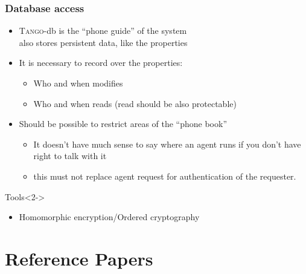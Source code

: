 \documentclass{beamer}
\newcommand{\tango}{\textsc{Tango}}
\begin{document}
\begin{frame}
\frametitle{Database access}
    \begin{itemize}
        \item \tango-db is the ``phone guide'' of the system\\also stores persistent data, like the properties
        \item It is necessary to record over the properties:
        \begin{itemize}
            \item Who and when modifies
            \item Who and when reads (read should be also protectable)
        \end{itemize}
        \item Should be possible to restrict areas of the ``phone book''
        \begin{itemize}
            \item It doesn't have much sense to say where an agent runs if you don't have right to talk with it
            \item this must not replace agent request for authentication of the requester.
        \end{itemize}
    \end{itemize}
    \begin{alertblock}{Tools}<2->
        \begin{itemize}
            \item Homomorphic encryption/Ordered cryptography
        \end{itemize}
    \end{alertblock}
\end{frame}

\section{Reference Papers}

\frame{\tableofcontents[sectionstyle=show/hide,subsectionstyle=show/show/hide]}
\end{document}
